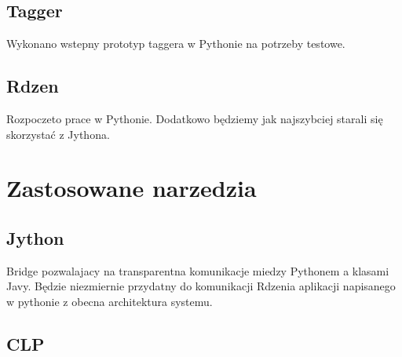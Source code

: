 \documentclass[12pt]{article}
\begin{document}
\subsection {Tagger} 
Wykonano wstepny prototyp taggera w Pythonie na potrzeby testowe.
\subsection {Rdzen} 
Rozpoczeto prace  w Pythonie. Dodatkowo będziemy jak najszybciej starali się skorzystać z Jythona.
\section{Zastosowane narzedzia}
\subsection{Jython} Bridge pozwalajacy na transparentna komunikacje miedzy Pythonem a klasami Javy. Będzie niezmiernie przydatny do komunikacji Rdzenia aplikacji napisanego w pythonie z obecna architektura systemu.
\subsection{CLP}
\end{document}
